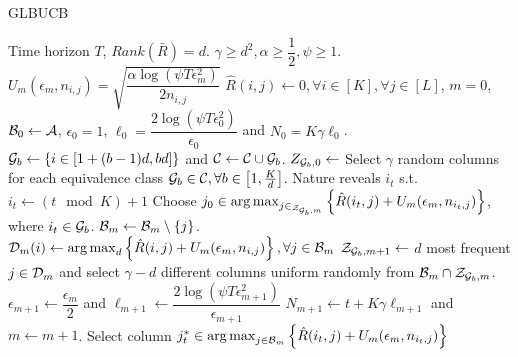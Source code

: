 \begin{algorithm}[!th]
\caption{GLBUCB}
\label{alg:NGLB}
\begin{algorithmic}[1]
 Time horizon $T$, $Rank(\bar{R}) = d$.
 $\gamma \geq d^2, \alpha \geq  \dfrac{1}{2}, \psi \geq 1$.
 $U_m(\epsilon_m, n_{i,j}) = \sqrt{\dfrac{\alpha\log(\psi T\epsilon_m^2)}{2n_{i,j}} }$
 $\hat{R}(i,j) \leftarrow 0, \forall i\in [K], \forall j\in [L]$, $m=0$, $\mathcal{B}_0 \leftarrow \mathcal{A}$, $\epsilon_0=1$, $\ell_0 =  \dfrac{2\log(\psi T\epsilon_{0}^2)}{\epsilon_{0}} $ and $N_0 =  K\gamma \ell_0 $.
 
\State  $\mathcal{G}_{b}\leftarrow \left\lbrace i\in \left[1+(b-1)d, bd\right]\right\rbrace$ and $\mathcal{C}\leftarrow \mathcal{C}\cup \mathcal{G}_{b}$.
\EndFor
\State $Z_{\mathcal{G}_b, 0}\leftarrow$ Select $\gamma$ random columns for each equivalence class $\mathcal{G}_b\in\mathcal{C}, \forall b\in \left[1,\frac{K}{d}\right] $. %
\State Nature reveals $i_t$ s.t. $i_t \leftarrow (t \mod K) + 1$ 
  
\State Choose $j_0 \in \mathop{\rm arg\,max}_{j\in_{\mathcal{Z}_{\mathcal{G}_b,m}}}\left\lbrace \hat{R}(i_t,j)  + U_m(\epsilon_m, n_{i_t,j})\right\rbrace $, where $i_t\in \mathcal{G}_b$.
\Else {}
\ColElim
\State {}
\State {}
\State $\mathcal{B}_m \leftarrow \mathcal{B}_m \setminus \lbrace j \rbrace$. 
\EndWhile
\EndFor
\EndColElim
\ResParam
{} 
\State $\mathcal{D}_{m}(i) \leftarrow \mathop{\rm arg\,max}_d\left\lbrace \hat{R}(i,j)  + U_m(\epsilon_m, n_{i,j})\right\rbrace, \forall j\in \mathcal{B}_m$
\EndFor
{} 
\State $\mathcal{Z}_{\mathcal{G}_b,m+1}\leftarrow$ $d$ most frequent $j\in\mathcal{D}_m$ and select $\gamma - d$ different columns uniform randomly from $\mathcal{B}_m\cap\mathcal{Z}_{\mathcal{G}_b,m}$.
\EndFor
\State $\epsilon_{m+1} \leftarrow \dfrac{\epsilon_m}{2}$ and $\ell_{m+1} \leftarrow \dfrac{2\log(\psi T\epsilon_{m+1}^2)}{\epsilon_{m+1}}$
\State $N_{m+1}\leftarrow t + K \gamma \ell_{m+1} $ and $m \leftarrow m + 1$.
\EndResParam
\EndIf
\Else {}
\State  Select column $j_t^*\in \mathop{\rm arg\,max}_{j\in\mathcal{B}_m} \left\lbrace \hat{R}(i_t,j) + U_m(\epsilon_m, n_{i_t,j})\right\rbrace$ 
\EndIf
\EndFor
\end{algorithmic}
\end{algorithm}


